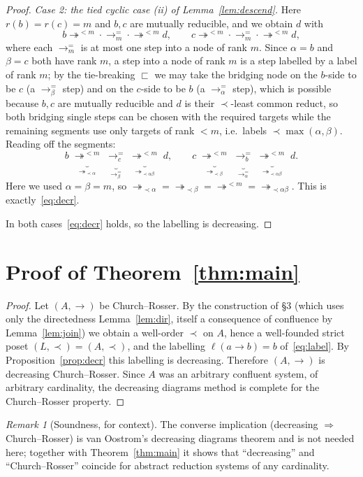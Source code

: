 \documentclass{amsart}
\theoremstyle{definition}
\theoremstyle{remark}
\newtheorem{remark}{Remark}
\newcommand{\redto}{\rightarrow}
\newcommand{\redtt}{\twoheadrightarrow}
\begin{document}
\begin{proof}
\emph{Case 2: the tied cyclic case (ii) of Lemma~\ref{lem:descend}.}  Here
$r(b)=r(c)=m$ and $b,c$ are mutually reducible, and we obtain $d$ with
\[
   b\redtt^{<m}\!\cdot\redto^{=}_{m}\!\cdot\redtt^{<m} d,
   \qquad
   c\redtt^{<m}\!\cdot\redto^{=}_{m}\!\cdot\redtt^{<m} d ,
\]
where each $\redto^{=}_m$ is at most one step into a node of rank $m$.  Since
$\alpha=b$ and $\beta=c$ both have rank $m$, a step into a node of rank $m$ is a
step labelled by a label of rank $m$; by the tie-breaking $\sqsubset$ we may
take the bridging node on the $b$-side to be $c$ (a $\redto^{=}_\beta$ step) and
on the $c$-side to be $b$ (a $\redto^{=}_\alpha$ step), which is possible because
$b,c$ are mutually reducible and $d$ is their $\prec$-least common reduct, so
both bridging single steps can be chosen with the required targets while the
remaining segments use only targets of rank $<m$, i.e.\ labels
$\prec\max(\alpha,\beta)$.  Reading off the segments:
\[
   b\;\underbrace{\redtt^{<m}}_{\redtt_{\prec\alpha}}\;
     \underbrace{\redto^{=}_{c}}_{\redto^{=}_\beta}\;
     \underbrace{\redtt^{<m}}_{\redtt_{\prec\alpha\beta}}\;d,
   \qquad
   c\;\underbrace{\redtt^{<m}}_{\redtt_{\prec\beta}}\;
     \underbrace{\redto^{=}_{b}}_{\redto^{=}_\alpha}\;
     \underbrace{\redtt^{<m}}_{\redtt_{\prec\alpha\beta}}\;d .
\]
Here we used $\alpha=\beta=m$, so $\redtt_{\prec\alpha}=\redtt_{\prec\beta}=
\redtt^{<m}=\redtt_{\prec\alpha\beta}$.  This is exactly~\eqref{eq:decr}.

In both cases~\eqref{eq:decr} holds, so the labelling is decreasing.
\end{proof}

\section{Proof of Theorem~\ref{thm:main}}

\begin{proof}
Let $(A,\redto)$ be Church--Rosser.  By the construction of \S3 (which uses only
the directedness Lemma~\ref{lem:dir}, itself a consequence of confluence by
Lemma~\ref{lem:join}) we obtain a well-order $\prec$ on $A$, hence a
well-founded strict poset $(L,\prec)=(A,\prec)$, and the labelling
$\ell(a\redto b)=b$ of~\eqref{eq:label}.  By Proposition~\ref{prop:decr} this
labelling is decreasing.  Therefore $(A,\redto)$ is decreasing Church--Rosser.
Since $A$ was an arbitrary confluent system, of arbitrary cardinality, the
decreasing diagrams method is complete for the Church--Rosser property.
\end{proof}

\begin{remark}[Soundness, for context]
The converse implication (decreasing $\Rightarrow$ Church--Rosser) is van
Oostrom's decreasing diagrams theorem and is not needed here; together with
Theorem~\ref{thm:main} it shows that ``decreasing'' and ``Church--Rosser''
coincide for abstract reduction systems of any cardinality.
\end{remark}
\end{document}
